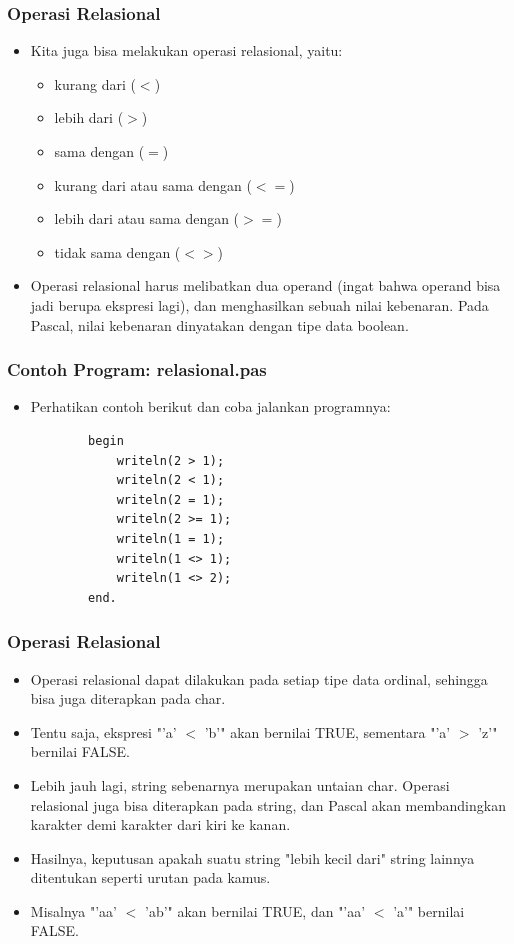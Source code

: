 \documentclass{beamer}
\begin{document}
\begin{frame}
\frametitle{Operasi Relasional}
\begin{itemize}
	\item Kita juga bisa melakukan operasi relasional, yaitu:
	\begin{itemize}
		\item kurang dari ($<$)
		\item lebih dari ($>$)
		\item sama dengan ($=$)
		\item kurang dari atau sama dengan ($<=$)
		\item lebih dari atau sama dengan ($>=$)
		\item tidak sama dengan ($<>$)
	\end{itemize}
	\item Operasi relasional harus melibatkan dua operand (ingat bahwa operand bisa jadi berupa ekspresi lagi), dan menghasilkan sebuah nilai kebenaran. Pada Pascal, nilai kebenaran dinyatakan dengan tipe data \alert{boolean}.
\end{itemize}
\end{frame}

\begin{frame}[fragile]
\frametitle{Contoh Program: relasional.pas}
\begin{itemize}
	\item Perhatikan contoh berikut dan coba jalankan programnya:
	\begin{lstlisting}
		begin
		    writeln(2 > 1);
		    writeln(2 < 1);
		    writeln(2 = 1);
		    writeln(2 >= 1);
		    writeln(1 = 1);
		    writeln(1 <> 1);
		    writeln(1 <> 2);
		end.
	\end{lstlisting}
\end{itemize}
\end{frame}

\begin{frame}
\frametitle{Operasi Relasional}
\begin{itemize}
	\item Operasi relasional dapat dilakukan pada setiap tipe data ordinal, sehingga bisa juga diterapkan pada char.
	\item Tentu saja, ekspresi "'a' $<$ 'b'" akan bernilai TRUE, sementara "'a' $>$ 'z'" bernilai FALSE.
	\item Lebih jauh lagi, string sebenarnya merupakan untaian char. Operasi relasional juga bisa diterapkan pada string, dan Pascal akan membandingkan karakter demi karakter dari kiri ke kanan. 
	\item Hasilnya, keputusan apakah suatu string "lebih kecil dari" string lainnya ditentukan seperti urutan pada kamus.
	\item Misalnya "'aa' $<$ 'ab'" akan bernilai TRUE, dan "'aa' $<$ 'a'" bernilai FALSE. 
\end{itemize}
\end{frame}
\end{document}

